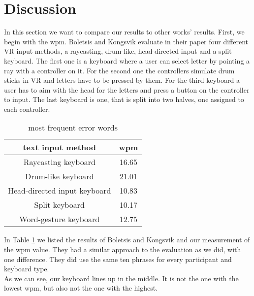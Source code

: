 \section{Discussion}
In this section we want to compare our results to other works' results.
First, we begin with the wpm. Boletsis and Kongsvik \cite{Boletsis2019ControllerbasedTT} evaluate in their paper four different VR input methods, a raycasting, drum-like, head-directed input and a split keyboard. The first one is a keyboard where a user can select letter by pointing a ray with a controller on it. For the second one the controllers simulate drum sticks in VR and letters have to be pressed by them. For the third keyboard a user has to aim with the head for the letters and press a button on the controller to input. The last keyboard is one, that is split into two halves, one assigned to each controller. 
\begin{table}[ht!]
    \centering
    \caption{most frequent error words}
    \begin{tabular}{cc} \toprule
        text input method&wpm\\ \midrule
        Raycasting keyboard& 16.65\\
        Drum-like keyboard& 21.01\\
        Head-directed input keyboard& 10.83\\
        Split keyboard& 10.17\\
        Word-gesture keyboard& 12.75\\
        \bottomrule
    \end{tabular}
    \label{tab:wpm_compare}
\end{table}

In Table \ref{tab:wpm_compare} we listed the results of Boletsis and Kongsvik \cite{Boletsis2019ControllerbasedTT} and our measurement of the wpm value. They had a similar approach to the evaluation as we did, with one difference. They did use the same ten phrases for every participant and keyboard type.\\
As we can see, our keyboard lines up in the middle. It is not the one with the lowest wpm, but also not the one with the highest.